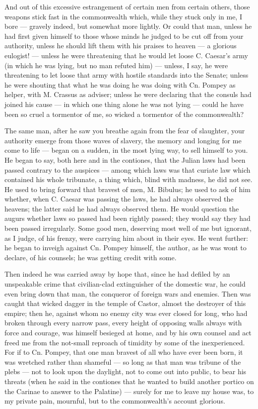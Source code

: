 And out of this excessive estrangement of certain men from certain others, those weapons stick fast in the commonwealth which, while they stuck only in me, I bore --- gravely indeed, but somewhat more lightly. Or could that man, unless he had first given himself to those whose minds he judged to be cut off from your authority, unless he should lift them with his praises to heaven --- a glorious eulogist! --- unless he were threatening that he would let loose C. Caesar's army (in which he was lying, but no man refuted him) --- unless, I say, he were threatening to let loose that army with hostile standards into the Senate; unless he were shouting that what he was doing he was doing with Cn. Pompey as helper, with M. Crassus as adviser; unless he were declaring that the consuls had joined his cause --- in which one thing alone he was not lying --- could he have been so cruel a tormentor of me, so wicked a tormentor of the commonwealth?

 The same man, after he saw you breathe again from the fear of slaughter, your authority emerge from those waves of slavery, the memory and longing for me come to life --- began on a sudden, in the most lying way, to sell himself to you. He began to say, both here and in the contiones, that the Julian laws had been passed contrary to the auspices --- among which laws was that curiate law which contained his whole tribunate, a thing which, blind with madness, he did not see. He used to bring forward that bravest of men, M. Bibulus; he used to ask of him whether, when C. Caesar was passing the laws, he had always observed the heavens; the latter said he had always observed them. He would question the augurs whether laws so passed had been rightly passed; they would say they had been passed irregularly. Some good men, deserving most well of me but ignorant, as I judge, of his frenzy, were carrying him about in their eyes. He went further: he began to inveigh against Cn. Pompey himself, the author, as he was wont to declare, of his counsels; he was getting credit with some.

 Then indeed he was carried away by hope that, since he had defiled by an unspeakable crime that civilian-clad extinguisher of the domestic war, he could even bring down that man, the conqueror of foreign wars and enemies. Then was caught that wicked dagger in the temple of Castor, almost the destroyer of this empire; then he, against whom no enemy city was ever closed for long, who had broken through every narrow pass, every height of opposing walls always with force and courage, was himself besieged at home, and by his own counsel and act freed me from the not-small reproach of timidity by some of the inexperienced. For if to Cn. Pompey, that one man bravest of all who have ever been born, it was wretched rather than shameful --- so long as that man was tribune of the plebs --- not to look upon the daylight, not to come out into public, to bear his threats (when he said in the contiones that he wanted to build another portico on the Carinae to answer to the Palatine) --- surely for me to leave my house was, to my private pain, mournful, but to the commonwealth's account glorious.

